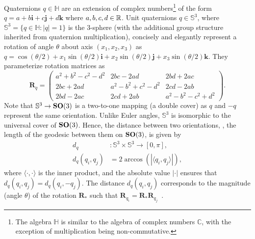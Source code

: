Quaternions $q \in \mathbb{H}$ are an extension of complex numbers\footnote{The algebra $\mathbb{H}$ is similar to the algebra of complex numbers $\mathbb{C}$, with the exception of multiplication being non-commutative.} of the form $q = a + b\boldsymbol{i} + c\boldsymbol{j} + d\boldsymbol{k}$ where $a,b,c,d \in \mathbb{R}$.
Unit quaternions $q \in \mathbb{S}^3$, where $\mathbb{S}^3 = \big\{ q \in \mathbb{H}: \lvert q \rvert = 1 \big\}$ is the 3-sphere (with the additional group structure inherited from quaternion multiplication), concisely and elegantly represent a rotation of angle $\theta$ about axis $(x_1, x_2, x_3)$ as $q = \cos(\theta/2) + x_1 \sin(\theta/2) \boldsymbol{i} + x_2 \sin(\theta/2) \boldsymbol{j} + x_3 \sin(\theta/2) \boldsymbol{k}$.
They parameterize rotation matrices as
\begin{equation*}
    \mathbf{R}_q =
    \begin{pmatrix}
        a^2+b^2-c^2-d^2 & 2bc-2ad & 2bd+2ac \\
        2bc+2ad & a^2-b^2+c^2-d^2 & 2cd-2ab \\
        2bd-2ac & 2cd+2ab & a^2-b^2-c^2+d^2
    \end{pmatrix}.
\end{equation*}
Note that $\mathbb{S}^3 \rightarrow \mathrm{\mathbf{SO}}(3)$ is a two-to-one mapping (a double cover) as $q$ and $-q$ represent the same orientation.
Unlike Euler angles, $\mathbb{S}^3$ is isomorphic to the universal cover of $\mathrm{\mathbf{SO}}(3)$.
Hence, the distance between two orientations, \ie, the length of the geodesic between them on $\mathrm{\mathbf{SO}}(3)$, is given by
\begin{equation}
    \begin{aligned}
        d_q &: \mathbb{S}^3 \times \mathbb{S}^3 \rightarrow [0,\pi], \\
        d_q(q_i, q_j) &= 2 \arccos \left( \left| \langle q_i, q_j \rangle \right| \right),
    \label{eqn:distance:orientations}
    \end{aligned}
\end{equation}
where $\langle \cdot, \cdot \rangle$ is the inner product, and the absolute value $\left| \cdot \right|$ ensures that $d_q(q_i, q_j) = d_q(q_i, -q_j)$.
The distance $d_q(q_i, q_j)$ corresponds to the magnitude (angle $\theta$) of the rotation $\mathbf{R}_*$ such that $\mathbf{R}_{q_i} = \mathbf{R}_* \mathbf{R}_{q_j}$~\cite{huynh2009metrics}.

